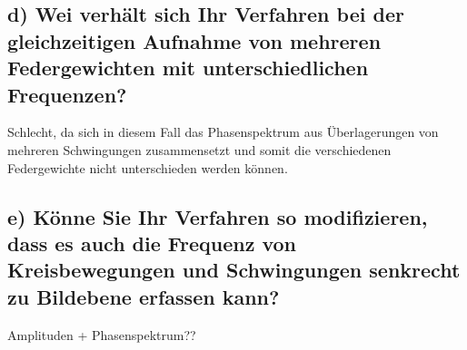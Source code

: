 \subsection*{d) Wei verh\"alt sich Ihr Verfahren bei der gleichzeitigen Aufnahme von mehreren Federgewichten mit unterschiedlichen Frequenzen?}
Schlecht, da sich in diesem Fall das Phasenspektrum aus \"Uberlagerungen von mehreren Schwingungen zusammensetzt und somit die verschiedenen Federgewichte nicht unterschieden werden k\"onnen.  

\subsection*{e) K\"onne Sie Ihr Verfahren so modifizieren, dass es auch die Frequenz von Kreisbewegungen und Schwingungen senkrecht zu Bildebene  erfassen kann?}
Amplituden + Phasenspektrum??